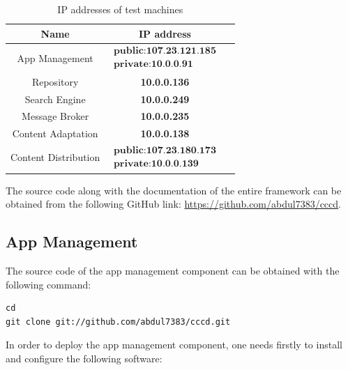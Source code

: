 \begin{table}[htb]
\begin{tabular}{|c|c|c|}
\hline 
Name & IP address \\ 
\hline 
App Management & $\begin{array}{l} \textbf{public:107.23.121.185} \\ \textbf{private:10.0.0.91}  \end{array}$ \\ 
\hline 
Repository & \textbf{10.0.0.136} \\ 
\hline 
Search Engine & \textbf{10.0.0.249} \\ 
\hline
Message Broker & \textbf{10.0.0.235} \\ 
\hline
Content Adaptation & \textbf{10.0.0.138} \\ 
\hline
Content Distribution & $\begin{array}{l} \textbf{public:107.23.180.173} \\ \textbf{private:10.0.0.139}  \end{array}$ \\ 
\hline
\end{tabular} 
\caption{IP addresses of test machines}
\label{tbl:ap_addresses}
\end{table} 

The source code along with the documentation of the entire framework can be obtained from the following GitHub link: \url{https://github.com/abdul7383/cccd}.

\subsection{App Management\label{sec:eval_te_en_app}}
The source code of the app management component can be obtained with the following command:
\begin{code}
\begin{verbatim}
cd
git clone git://github.com/abdul7383/cccd.git
\end{verbatim}
\end{code}

In order to deploy the app management component, one needs firstly to install and configure the following software:

